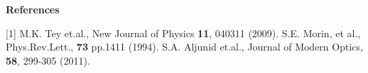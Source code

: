 \documentclass[portrait,a0,final]{a0poster} %
\newenvironment{poster}{
  \begin{center}
  \begin{minipage}[c]{0.98\textwidth}
}{
  \end{minipage} 
  \end{center}
}
\begin{document}
\begin{poster}
\begin{multicols}{2}
\begin{flushleft}
       \begin{center}{\bf \large \textsf {References}}\end{center}
       [1] M.K. Tey et.al., New Journal of Physics {\textbf{11}}, 040311 (2009).
	\newline
         [2] S.E. Morin, et al., Phys.Rev.Lett., {\textbf {73}} pp.1411 (1994).
        \newline
	 [3] S.A. Aljunid et.al., Journal of Modern Optics, {\textbf{58}}, 299-305 (2011).

\end{flushleft}
    
\end{multicols}

\end{poster}
\end{document}
